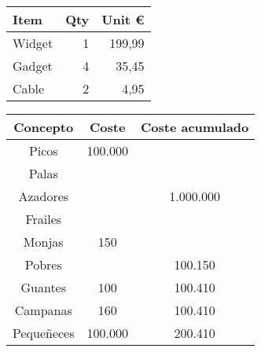 \documentclass[10pt]{article}
\begin{document}
\begin{tabular}{|l|r|r|} \hline
    Item    & Qty   & Unit \euro   \\\hline
    Widget  & 1     & 199,99    \\
    Gadget  & 4     & 35,45     \\
    Cable   & 2     & 4,95      \\\hline
\end{tabular} 






\begin{table}[]
\begin{tabular}{|c|c|c|}
\hline
\textbf{Concepto} & \textbf{Coste}           & \textbf{Coste acumulado} \\ \hline
Picos             & {100.000} &                          \\ \cline{3-3} 
Palas             &                          &                          \\ \cline{3-3} 
Azadores          &                          & 1.000.000                \\ \hline
Frailes           &                          &                          \\ \cline{3-3} 
Monjas            & 150                      &                          \\ \cline{3-3} 
Pobres            &                          & 100.150                  \\ \hline
Guantes           & 100                      & 100.410                  \\ \hline
Campanas          & 160                      & 100.410                  \\ \hline
Pequeñeces        & 100.000                  & 200.410                  \\ \hline
\end{tabular}
\end{table}
\end{document}
